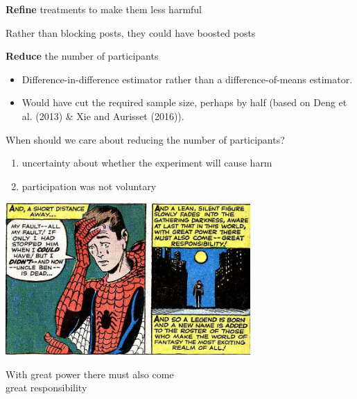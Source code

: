 \documentclass[aspectratio=169]{beamer}
\begin{document}
\begin{frame}

\begin{framed}
\textbf{Refine} treatments to make them less harmful
\end{framed}

\pause
Rather than blocking posts, they could have boosted posts

\end{frame}
\begin{frame}

\begin{framed}
\textbf{Reduce} the number of participants
\end{framed}

\pause
\begin{itemize}
\item Difference-in-difference estimator rather than a difference-of-means estimator.  
\pause
\item Would have cut the required sample size, perhaps by half (based on Deng et al. (2013) \& Xie and Aurisset (2016)).
\end{itemize}

\end{frame}
\begin{frame}

When should we care about reducing the number of participants?
\pause
\begin{enumerate}
\item uncertainty about whether the experiment will cause harm
\item participation was not voluntary
\end{enumerate}

\end{frame}
\begin{frame}

\begin{center}
\includegraphics[width=0.7\textwidth]{figures/spiderman_great_power}
\end{center}

\pause

\LARGE{
\begin{center}
With great power there must also come\\great responsibility
\end{center}
}

\end{frame}
\end{document}
